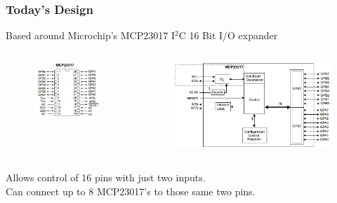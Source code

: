 \documentclass[t]{beamer}
\begin{document}
\begin{frame}
\frametitle{Today's Design}
Based around Microchip's MCP23017 I$^2$C 16 Bit I/O expander

\begin{columns}[c]
	\begin{figure}
		\includegraphics[width=1\linewidth]{mcp23071pinout.PNG}
	\end{figure}
	
	\begin{figure}
		\includegraphics[width=1\linewidth]{mcpFunctional.png}
	\end{figure}
\end{columns}
\vspace{7mm}
Allows control of 16 pins with just two inputs.\\
Can connect up to 8 MCP23017's to those same two pins.

\end{frame}
\end{document}
